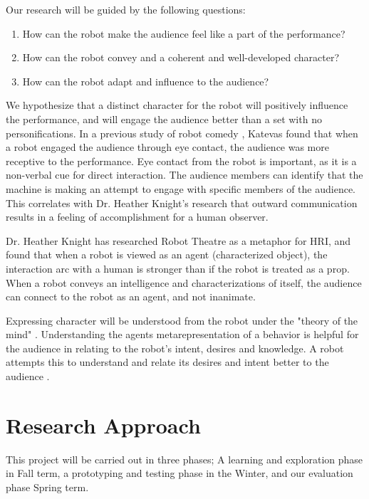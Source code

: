 \documentclass[onecolumn, draftclsnofoot,10pt, compsoc]{IEEEtran}
\begin{document}
Our research will be guided by the following questions:
\begin{enumerate}[\IEEEsetlabelwidth{6)}]
\item How can the robot make the audience feel like a part of the performance?
\item How can the robot convey and a coherent and well-developed character?
\item How can the robot adapt and influence to the audience?
\end{enumerate}

We hypothesize that a distinct character for the robot will positively influence the performance, and will engage the audience better than a set with no personifications. In a previous study of robot comedy \cite{RobotComedyLab:2015}, Katevas found that when a robot engaged the audience through eye contact, the audience was more receptive to the performance. Eye contact from the robot is important, as it is a non-verbal cue for direct interaction. The audience members can identify that the machine is making an attempt to engage with specific members of the audience. This correlates with Dr. Heather Knight's \cite{KnightEightLessons:2011} research that outward communication results in a feeling of accomplishment for a human observer.

Dr. Heather Knight has researched Robot Theatre as a metaphor for HRI, and found that when a robot is viewed as an agent (characterized object), the interaction arc with a human is stronger than if the robot is treated as a prop. When a robot conveys an intelligence and characterizations of itself, the audience can connect to the robot as an agent, and not inanimate.

Expressing character will be understood from the robot under the "theory of the mind" \cite{leslie}. Understanding the agents metarepresentation of a behavior is helpful for the audience in relating to the robot's intent, desires and knowledge. A robot attempts this to understand and relate its desires and intent better to the audience \cite{theoryOfMindRobots}.

\section{Research Approach}
This project will be carried out in three phases; A learning and exploration phase in Fall term, a prototyping and testing phase in the Winter, and our evaluation phase Spring term.
\end{document}
